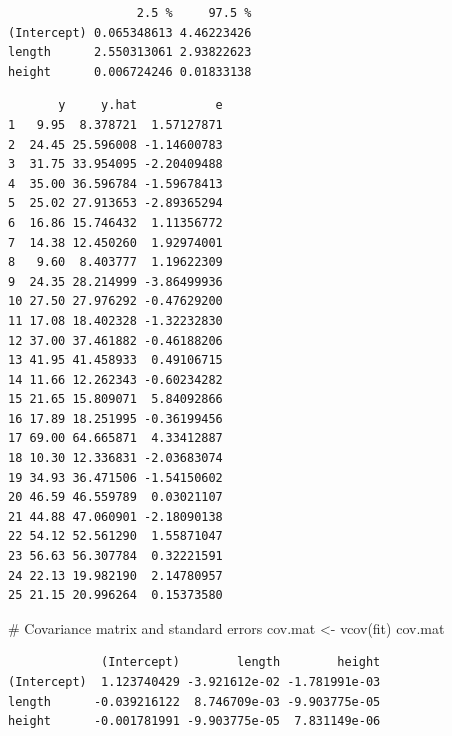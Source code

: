 \documentclass[
  letterpaper,
]{scrbook}
\newenvironment{Shaded}{\begin{snugshade}}{\end{snugshade}}
\newcommand{\AttributeTok}[1]{\textcolor[rgb]{0.40,0.45,0.13}{#1}}
\newcommand{\CommentTok}[1]{\textcolor[rgb]{0.37,0.37,0.37}{#1}}
\newcommand{\FunctionTok}[1]{\textcolor[rgb]{0.28,0.35,0.67}{#1}}
\newcommand{\NormalTok}[1]{\textcolor[rgb]{0.00,0.23,0.31}{#1}}
\newcommand{\OtherTok}[1]{\textcolor[rgb]{0.00,0.23,0.31}{#1}}
\newcommand{\SpecialCharTok}[1]{\textcolor[rgb]{0.37,0.37,0.37}{#1}}
\begin{document}
\begin{verbatim}
                  2.5 %     97.5 %
(Intercept) 0.065348613 4.46223426
length      2.550313061 2.93822623
height      0.006724246 0.01833138
\end{verbatim}

\begin{Shaded}
\end{Shaded}

\begin{verbatim}
       y     y.hat           e
1   9.95  8.378721  1.57127871
2  24.45 25.596008 -1.14600783
3  31.75 33.954095 -2.20409488
4  35.00 36.596784 -1.59678413
5  25.02 27.913653 -2.89365294
6  16.86 15.746432  1.11356772
7  14.38 12.450260  1.92974001
8   9.60  8.403777  1.19622309
9  24.35 28.214999 -3.86499936
10 27.50 27.976292 -0.47629200
11 17.08 18.402328 -1.32232830
12 37.00 37.461882 -0.46188206
13 41.95 41.458933  0.49106715
14 11.66 12.262343 -0.60234282
15 21.65 15.809071  5.84092866
16 17.89 18.251995 -0.36199456
17 69.00 64.665871  4.33412887
18 10.30 12.336831 -2.03683074
19 34.93 36.471506 -1.54150602
20 46.59 46.559789  0.03021107
21 44.88 47.060901 -2.18090138
22 54.12 52.561290  1.55871047
23 56.63 56.307784  0.32221591
24 22.13 19.982190  2.14780957
25 21.15 20.996264  0.15373580
\end{verbatim}

\begin{Shaded}
\begin{Highlighting}[]
\CommentTok{\# Covariance matrix and standard errors}
\NormalTok{cov.mat }\OtherTok{\textless{}{-}} \FunctionTok{vcov}\NormalTok{(fit)}
\NormalTok{cov.mat}
\end{Highlighting}
\end{Shaded}

\begin{verbatim}
             (Intercept)        length        height
(Intercept)  1.123740429 -3.921612e-02 -1.781991e-03
length      -0.039216122  8.746709e-03 -9.903775e-05
height      -0.001781991 -9.903775e-05  7.831149e-06
\end{verbatim}
\end{document}
